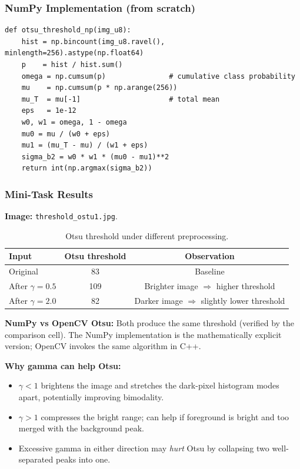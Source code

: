 \documentclass[12pt,a4paper]{article}
\begin{document}
\subsubsection*{NumPy Implementation (from scratch)}
\begin{lstlisting}
def otsu_threshold_np(img_u8):
    hist = np.bincount(img_u8.ravel(), minlength=256).astype(np.float64)
    p    = hist / hist.sum()
    omega = np.cumsum(p)               # cumulative class probability
    mu    = np.cumsum(p * np.arange(256))
    mu_T  = mu[-1]                     # total mean
    eps   = 1e-12
    w0, w1 = omega, 1 - omega
    mu0 = mu / (w0 + eps)
    mu1 = (mu_T - mu) / (w1 + eps)
    sigma_b2 = w0 * w1 * (mu0 - mu1)**2
    return int(np.argmax(sigma_b2))
\end{lstlisting}

\subsubsection*{Mini-Task Results}

\textbf{Image:} \texttt{threshold\_ostu1.jpg}.

\begin{table}[H]
  \centering
  \begin{tabular}{@{}lcc@{}}
    \toprule
    Input & Otsu threshold & Observation \\
    \midrule
    Original               & 83  & Baseline \\
    After $\gamma = 0.5$   & 109 & Brighter image $\Rightarrow$ higher threshold \\
    After $\gamma = 2.0$   & 82  & Darker image $\Rightarrow$ slightly lower threshold \\
    \bottomrule
  \end{tabular}
  \caption{Otsu threshold under different preprocessing.}
\end{table}

\textbf{NumPy vs OpenCV Otsu:} Both produce the same threshold (verified by the
comparison cell). The NumPy implementation is the mathematically explicit version;
OpenCV invokes the same algorithm in C++.

\textbf{Why gamma can help Otsu:}
\begin{itemize}[leftmargin=*]
  \item $\gamma < 1$ brightens the image and stretches the dark-pixel histogram modes
        apart, potentially improving bimodality.
  \item $\gamma > 1$ compresses the bright range; can help if foreground is bright
        and too merged with the background peak.
  \item Excessive gamma in either direction may \emph{hurt} Otsu by collapsing two
        well-separated peaks into one.
\end{itemize}
\end{document}
